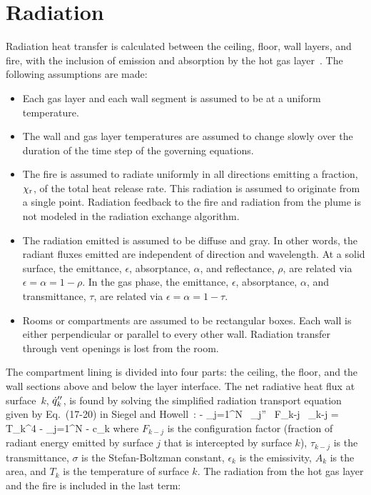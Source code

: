 \documentclass[12pt]{book}
\begin{document}
\section{Radiation}
\label{sec:Radiation}

Radiation heat transfer is calculated between the ceiling, floor, wall layers, and fire, with the inclusion of emission and absorption by the hot gas layer~\cite{Forney_radiation}. The following assumptions are made:
\begin{itemize}
\item Each gas layer and each wall segment is assumed to be at a uniform temperature.
\item The wall and gas layer temperatures are assumed to change slowly over the duration of the time step of the governing equations.
\item The fire is assumed to radiate uniformly in all directions emitting a fraction, $\chi_{\rm r}$, of the total heat release rate.  This radiation is assumed to originate from a single point.  Radiation feedback to the fire and radiation from the plume is not modeled in the radiation exchange algorithm.
\item The radiation emitted is assumed to be diffuse and gray.  In other words, the radiant fluxes emitted are independent of direction and wavelength. At a solid surface, the emittance, $\epsilon$, absorptance, $\alpha$, and reflectance, $\rho$, are related via $\epsilon = \alpha = 1 - \rho$. In the gas phase, the emittance, $\epsilon$, absorptance, $\alpha$, and transmittance, $\tau$, are related via $\epsilon = \alpha = 1 - \tau$.
\item Rooms or compartments are assumed to be rectangular boxes.  Each wall is either perpendicular or parallel to every other wall.  Radiation transfer through vent openings is lost from the room.
\end{itemize}
The compartment lining is divided into four parts: the ceiling, the floor, and the wall sections above and below the layer interface. The net radiative heat flux at surface~$k$, $\dot{q}_k''$, is found by solving the simplified radiation transport equation given by Eq.~(17-20) in Siegel and Howell~\cite{SiegelandHowell:1981}:
\be
    - \displaystyle\sum_{j=1}^N  \, \dq_j'' \, F_{k-j} \, \tau_{k-j} = \sigma T_k^4 - \displaystyle\sum_{j=1}^N  - c_k \label{RTE}
\ee
where $F_{k-j}$ is the configuration factor (fraction of radiant energy emitted by surface $j$ that is intercepted by surface $k$), $\tau_{k-j}$ is the transmittance, $\sigma$ is the Stefan-Boltzman constant, $\epsilon_k$ is the emissivity, $A_k$ is the area, and $T_k$ is the temperature of surface $k$. The radiation from the hot gas layer and the fire is included in the last term:
\end{document}
